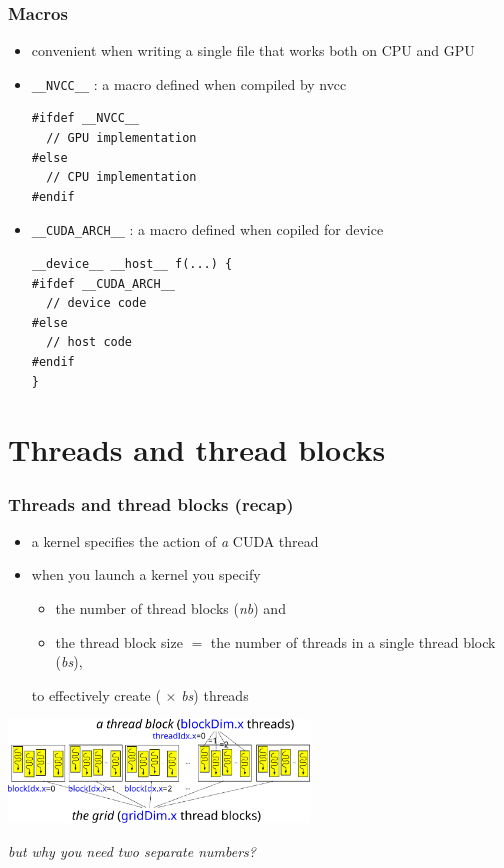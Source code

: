 \documentclass[12pt,dvipdfmx]{beamer}
\newcommand{\ao}[1]{{\color{blue}#1}}
\begin{document}
\begin{frame}[fragile]
  \frametitle{Macros}
  \begin{itemize}
  \item convenient when writing a single file that works both on CPU and GPU
    
\item {\tt \_\_NVCC\_\_} : a macro defined when compiled by nvcc
\begin{lstlisting}
#ifdef __NVCC__
  // GPU implementation
#else
  // CPU implementation
#endif    
\end{lstlisting}
  
\item {\tt \_\_CUDA\_ARCH\_\_} : a macro defined when copiled for device
\begin{lstlisting}
__device__ __host__ f(...) {
#ifdef __CUDA_ARCH__
  // device code
#else
  // host code
#endif
}
\end{lstlisting}
\end{itemize}
\end{frame}

\section{Threads and thread blocks}

\begin{frame}
\frametitle{Threads and thread blocks (recap)}
\begin{itemize}
\item a kernel specifies the action of {\it a} CUDA thread
\item when you launch a kernel you specify
  \begin{itemize}
  \item the number of thread blocks (\ao{\it nb}) and
  \item the thread block size $=$ the number of threads in a single thread block (\ao{\it bs}),
  \end{itemize}
  to effectively create (\ao{{\it nb} $\times$ {\it bs}}) threads
\end{itemize}

\begin{center}
  \includegraphics[width=0.6\textwidth]{out/pdf/svg/thread_blocks_2.pdf}
\end{center}

\ao{\it but why you need two separate numbers?}

\end{frame}
\end{document}

